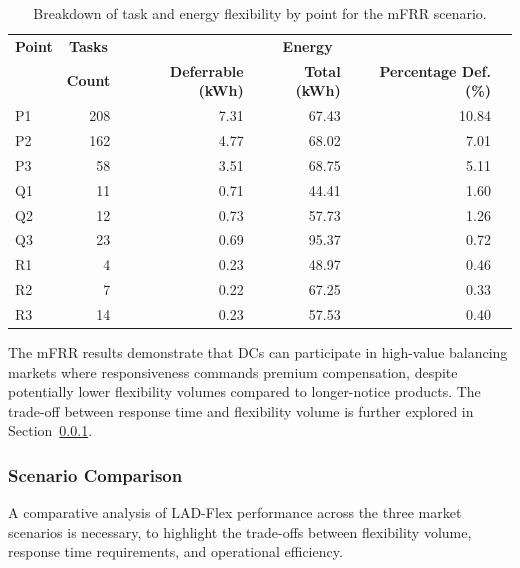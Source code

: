 \documentclass[preprint,12pt]{elsarticle}
\begin{document}
\begin{table}[h!]
\centering
\renewcommand{\arraystretch}{1.2}
\begin{tabular}{@{}lrr rrr@{}}
\toprule
\textbf{Point} & \multicolumn{1}{c}{\textbf{Tasks}} & \multicolumn{3}{c}{\textbf{Energy}} \\
              & \textbf{Count} & \textbf{Deferrable (kWh)} & \textbf{Total (kWh)} & \textbf{Percentage Def. (\%)} \\
\midrule
P1 & 208 & 7.31  & 67.43  & 10.84 \\
P2 & 162 & 4.77  & 68.02  & 7.01  \\
P3 & 58  & 3.51  & 68.75  & 5.11  \\
Q1 & 11  & 0.71  & 44.41  & 1.60  \\
Q2 & 12  & 0.73  & 57.73  & 1.26  \\
Q3 & 23  & 0.69  & 95.37  & 0.72  \\
R1 & 4   & 0.23  & 48.97  & 0.46  \\
R2 & 7   & 0.22  & 67.25  & 0.33  \\
R3 & 14  & 0.23  & 57.53  & 0.40  \\
\bottomrule
\end{tabular}
\caption{Breakdown of task and energy flexibility by point for the mFRR scenario.}
\label{tab:energy_flexibility_mfrr}
\end{table}

The mFRR results demonstrate that DCs can participate in high-value balancing markets where responsiveness commands premium compensation, despite potentially lower flexibility volumes compared to longer-notice products. The trade-off between response time and flexibility volume is further explored in Section~\ref{sec:scenario_comparison}.







\subsubsection{Scenario Comparison} \label{sec:scenario_comparison}

A comparative analysis of LAD-Flex performance across the three market scenarios is necessary, to highlight the trade-offs between flexibility volume, response time requirements, and operational efficiency.
\end{document}
